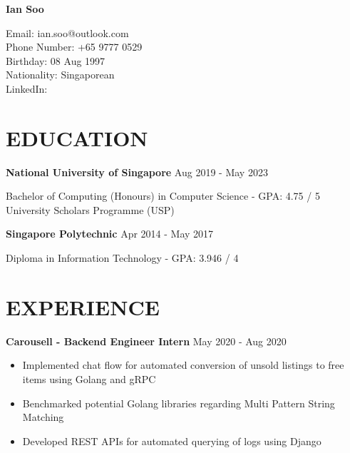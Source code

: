\documentclass[11pt]{article} %
\begin{document}

{\LARGE\bfseries Ian Soo} %

Email: ian.soo@outlook.com\\
Phone Number: +65 9777 0529\\
Birthday: 08 Aug 1997\\
Nationality: Singaporean\\
LinkedIn: \href{https://www.linkedin.com/in/sooian/}{\color{black}{https://www.linkedin.com/in/sooian/}}


\section*{EDUCATION}

\textbf{National University of Singapore} \hfill Aug 2019 - May 2023

Bachelor of Computing (Honours) in Computer Science - GPA: 4.75 / 5\\
University Scholars Programme (USP)

\medskip

\textbf{Singapore Polytechnic} \hfill Apr 2014 - May 2017

Diploma in Information Technology - GPA: 3.946 / 4


\section*{EXPERIENCE}

\textbf{Carousell - Backend Engineer Intern} \hfill May 2020 - Aug 2020

\smallskip
\begin{itemize}

    \item Implemented chat flow for automated conversion of unsold listings to free items using Golang and gRPC
    \item Benchmarked potential Golang libraries regarding Multi Pattern String Matching
    \item Developed REST APIs for automated querying of logs using Django

\end{itemize}
\end{document}
